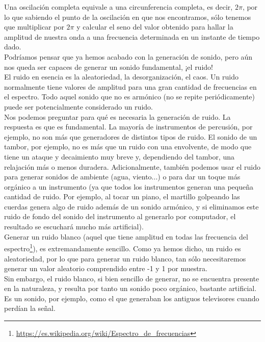Una oscilación completa equivale a una circunferencia completa, es decir, \(2\pi\), por lo que sabiendo el punto de la oscilación en que nos encontramos, sólo tenemos que multiplicar por \(2\pi\) y calcular el seno del valor obtenido para hallar la amplitud de nuestra onda a una frecuencia determinada en un instante de tiempo dado.\\

Podríamos pensar que ya hemos acabado con la generación de sonido, pero aún nos queda ser capaces de generar un sonido fundamental, ¡el ruido!\\

El ruido en esencia es la aleatoriedad, la desorganización, el caos. Un ruido normalmente tiene valores de amplitud para una gran cantidad de frecuencias en el espectro. Todo aquel sonido que no es armónico (no se repite periódicamente) puede ser potencialmente considerado un ruido.\\

Nos podemos preguntar para qué es necesaria la generación de ruido. La respuesta es que es fundamental. La mayoría de instrumentos de percusión, por ejemplo, no son más que generadores de distintos tipos de ruido. El sonido de un tambor, por ejemplo, no es más que un ruido con una envolvente, de modo que tiene un ataque y decaimiento muy breve y, dependiendo del tambor, una relajación más o menos duradera. Adicionalmente, también podemos usar el ruido para generar sonidos de ambiente (agua, viento...) o para dar un toque más orgánico a un instrumento (ya que todos los instrumentos generan una pequeña cantidad de ruido. Por ejemplo, al tocar un piano, el martillo golpeando las cuerdas genera algo de ruido además de un sonido armónico, y si eliminamos este ruido de fondo del sonido del instrumento al generarlo por computador, el resultado se escuchará mucho más artificial).\\

Generar un ruido blanco (aquel que tiene amplitud en todas las frecuencia del espectro\footnote{\url{https://es.wikipedia.org/wiki/Espectro_de_frecuencias}}), es extremandamente sencillo. Como ya hemos dicho, un ruido es aleatoriedad, por lo que para generar un ruido blanco, tan sólo necesitaremos generar un valor aleatorio comprendido entre -1 y 1 por muestra.\\

Sin embargo, el ruido blanco, si bien sencillo de generar, no se encuentra presente en la naturaleza, y resulta por tanto un sonido poco orgánico, bastante artificial. Es un sonido, por ejemplo, como el que generaban los antiguos televisores cuando perdían la señal.\\

